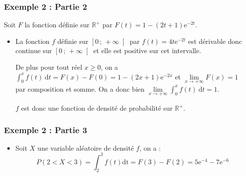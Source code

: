 \documentclass[xcolor=svgnames,t,final]{beamer}
\newcommand{\R}{\mathbb{R}}
\newcommand{\Interfo}[2]{\left[#1\, ;\, #2\right[}
\newcommand{\limite}[2]{\lim\limits
_{x \to #1} #2}
\newcommand{\dt}{\ensuremath{\text{d}t}}		%
\newcommand{\integralet}[3]{\int_{#1}^{#2} #3 \ \dt}
\begin{document}
\begin{frame}

\frametitle{Exemple 2 : Partie 2}

 Soit $F$ la fonction définie sur $\R^{+}$ par $F(t)=1-(2t+1)\text{e}^{-2t}$.
 
\begin{itemize}
\pause \item La fonction  $f$ définie sur $\Interfo{0}{+\infty}$ par $f(t)=4t\text{e}^{-2t}$ est dérivable donc continue sur $\Interfo{0}{+\infty}$ et  elle est positive sur cet intervalle. 

De plus pour tout réel $x\geqslant 0$, on a $\integralet{0}{x}{f(t)}=F(x)-F(0)= 1-(2x+1)\text{e}^{-2x}$ et $\limite{+\infty}{F(x)}=1$ par composition et somme. On a donc bien $\lim\limits_{x\to +\infty}\integralet{0}{x}{f(t)}=1$.

$f$ est donc  une fonction de densité de probabilité sur $\R^{+}$.

\end{itemize}


\end{frame}



\begin{frame}

\frametitle{Exemple 2 : Partie 3}

 
\begin{itemize}

\pause \item Soit $X$ une variable aléatoire de densité $f$, on a :
$$P\left(2<X<3\right)=\int_{2}^{3}f(t)\text{dt}=F(3)-F(2)=5\text{e}^{-4}-7\text{e}^{-6}$$
\end{itemize}


\end{frame}
\end{document}
